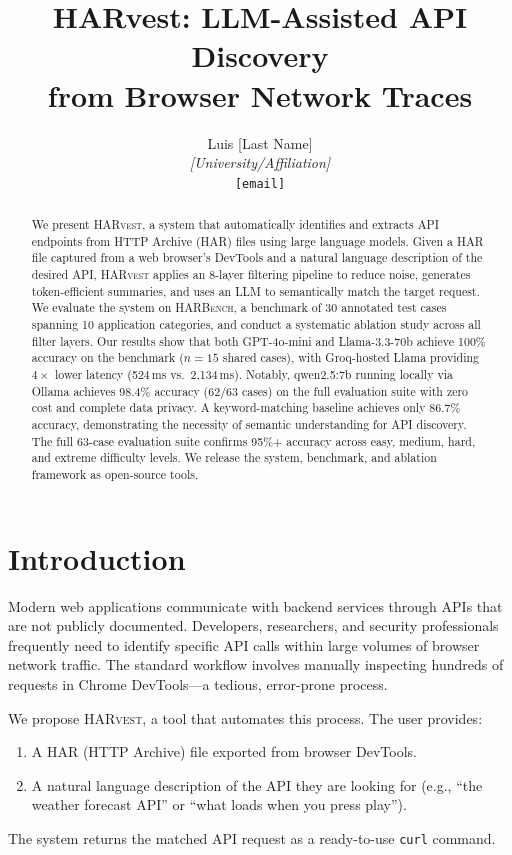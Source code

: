 \documentclass[10pt,twocolumn]{article}
\title{\textbf{HARvest: LLM-Assisted API Discovery\\from Browser Network Traces}}
\author{
  Luis [Last Name]\\
  \textit{[University/Affiliation]}\\
  \texttt{[email]}
}
\date{}
\begin{document}
\maketitle
\thispagestyle{empty}

\begin{abstract}
We present \textsc{HARvest}, a system that automatically identifies and extracts API endpoints from HTTP Archive (HAR) files using large language models. Given a HAR file captured from a web browser's DevTools and a natural language description of the desired API, \textsc{HARvest} applies an 8-layer filtering pipeline to reduce noise, generates token-efficient summaries, and uses an LLM to semantically match the target request. We evaluate the system on \textsc{HARBench}, a benchmark of 30 annotated test cases spanning 10 application categories, and conduct a systematic ablation study across all filter layers. Our results show that both GPT-4o-mini and Llama-3.3-70b achieve 100\% accuracy on the benchmark ($n{=}15$ shared cases), with Groq-hosted Llama providing $4\times$ lower latency (524\,ms vs.\ 2,134\,ms). Notably, qwen2.5:7b running locally via Ollama achieves 98.4\% accuracy (62/63 cases) on the full evaluation suite with zero cost and complete data privacy. A keyword-matching baseline achieves only 86.7\% accuracy, demonstrating the necessity of semantic understanding for API discovery. The full 63-case evaluation suite confirms 95\%+ accuracy across easy, medium, hard, and extreme difficulty levels. We release the system, benchmark, and ablation framework as open-source tools.
\end{abstract}

\section{Introduction}

Modern web applications communicate with backend services through APIs that are not publicly documented. Developers, researchers, and security professionals frequently need to identify specific API calls within large volumes of browser network traffic. The standard workflow involves manually inspecting hundreds of requests in Chrome DevTools---a tedious, error-prone process.

We propose \textsc{HARvest}, a tool that automates this process. The user provides:
\begin{enumerate}[nosep]
  \item A HAR (HTTP Archive) file exported from browser DevTools.
  \item A natural language description of the API they are looking for (e.g., ``the weather forecast API'' or ``what loads when you press play'').
\end{enumerate}
The system returns the matched API request as a ready-to-use \texttt{curl} command.
\end{document}
